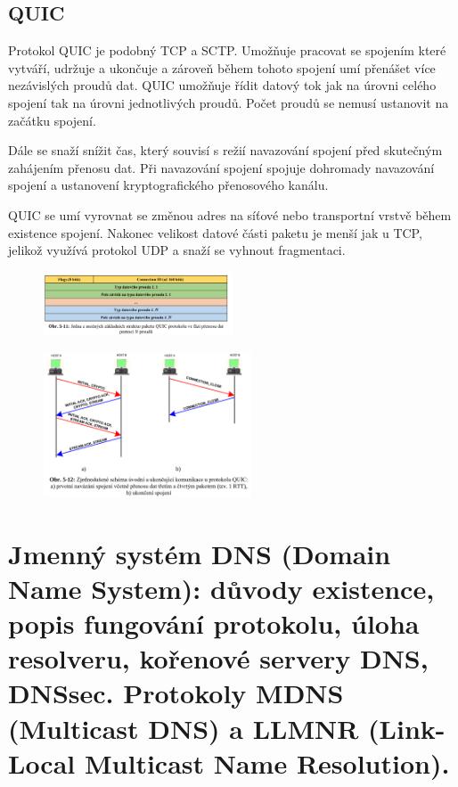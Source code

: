 \subsection{QUIC}

Protokol QUIC je podobný TCP a SCTP.
Umožňuje pracovat se spojením které vytváří, udržuje a ukončuje a zároveň během tohoto spojení umí přenášet více nezávislých proudů dat.
QUIC umožňuje řídit datový tok jak na úrovni celého spojení tak na úrovni jednotlivých proudů.
Počet proudů se nemusí ustanovit na začátku spojení.

Dále se snaží snížit čas, který souvisí s režií navazování spojení před skutečným zahájením přenosu dat.
Při navazování spojení spojuje dohromady navazování spojení a ustanovení kryptografického přenosového kanálu.

QUIC se umí vyrovnat se změnou adres na síťové nebo transportní vrstvě během existence spojení.
Nakonec velikost datové části paketu je menší jak u TCP, jelikož využívá protokol UDP a snaží se vyhnout fragmentaci.

\begin{figure}[!h]
    \centering
    \includegraphics[width=0.5\textwidth]{obrazky/035.png}
\end{figure}


\begin{figure}[!h]
    \centering
    \includegraphics[width=0.55\textwidth]{obrazky/036.png}
\end{figure}


\clearpage
\section{Jmenný systém DNS (Domain Name System): důvody existence, popis fungování protokolu, úloha resolveru, kořenové servery DNS, DNSsec. Protokoly MDNS (Multicast DNS) a LLMNR (Link-Local Multicast Name Resolution).}

